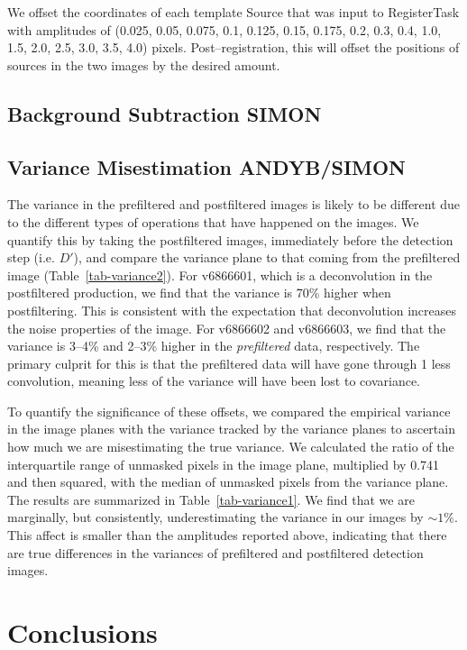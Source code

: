\documentclass[prd, nofootinbib, floatfix, 11pt,tightenlines,times]{article}
\begin{document}
We offset the coordinates of each template Source that was input to
RegisterTask with amplitudes of (0.025, 0.05, 0.075, 0.1, 0.125, 0.15,
0.175, 0.2, 0.3, 0.4, 1.0, 1.5, 2.0, 2.5, 3.0, 3.5, 4.0) pixels.
Post--registration, this will offset the positions of sources in the
two images by the desired amount.

\subsection{Background Subtraction {\bf SIMON}}

\subsection{Variance Misestimation {\bf ANDYB/SIMON}}

The variance in the prefiltered and postfiltered images is likely to
be different due to the different types of operations that have
happened on the images.  We quantify this by taking the postfiltered
images, immediately before the detection step (i.e. $D'$), and compare
the variance plane to that coming from the prefiltered image
(Table~\ref{tab-variance2}).  For v6866601, which is a deconvolution
in the postfiltered production, we find that the variance is 70\%
higher when postfiltering.  This is consistent with the expectation
that deconvolution increases the noise properties of the image.  For
v6866602 and v6866603, we find that the variance is 3--4\% and 2--3\%
higher in the {\it prefiltered} data, respectively.  The primary
culprit for this is that the prefiltered data will have gone through 1
less convolution, meaning less of the variance will have been lost to
covariance.

To quantify the significance of these offsets, we compared the
empirical variance in the image planes with the variance tracked by
the variance planes to ascertain how much we are misestimating the
true variance.  We calculated the ratio of the interquartile range of
unmasked pixels in the image plane, multiplied by 0.741 and then
squared, with the median of unmasked pixels from the variance plane.
The results are summarized in Table~\ref{tab-variance1}.  We find that
we are marginally, but consistently, underestimating the variance in
our images by $\sim 1\%$.  This affect is smaller than the amplitudes
reported above, indicating that there are true differences in the
variances of prefiltered and postfiltered detection images.

\section{Conclusions}
\end{document}
